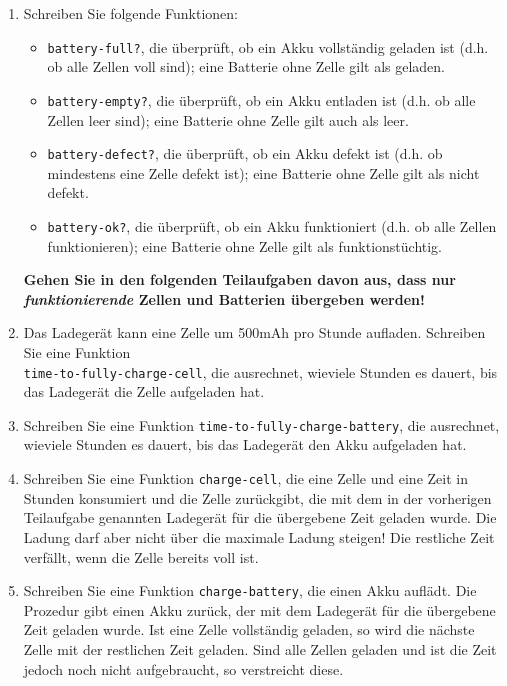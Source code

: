 \begin{aufgabe}
\begin{enumerate}
  \item Schreiben Sie folgende Funktionen:

    \begin{itemize}
    \item \texttt{battery-full?}, die überprüft, ob ein Akku
      vollständig geladen ist (d.h. ob alle Zellen voll sind); eine
      Batterie ohne Zelle gilt als geladen.

    \item \texttt{battery-empty?}, die überprüft, ob ein Akku entladen
      ist (d.h. ob alle Zellen leer sind); eine Batterie ohne Zelle
      gilt auch als leer.

    \item \texttt{battery-defect?}, die überprüft, ob ein Akku defekt
      ist (d.h. ob mindestens eine Zelle defekt ist); eine Batterie
      ohne Zelle gilt als nicht defekt.

    \item \texttt{battery-ok?}, die überprüft, ob ein Akku
      funktioniert (d.h. ob alle Zellen funktionieren); eine Batterie
      ohne Zelle gilt als funktionstüchtig.
      
    \end{itemize}

    \textbf{Gehen Sie in den folgenden Teilaufgaben davon aus, dass
      nur \emph{funktionierende} Zellen und Batterien übergeben
      werden!}

  \item Das Ladegerät kann eine Zelle um 500mAh pro Stunde
    aufladen.  Schreiben Sie eine Funktion \\
    \texttt{time-to-fully-charge-cell}, die ausrechnet, wieviele
    Stunden es dauert, bis das Ladegerät die Zelle aufgeladen hat.

  \item Schreiben Sie eine Funktion
    \texttt{time-to-fully-charge-battery}, die ausrechnet, wieviele
    Stunden es dauert, bis das Ladegerät den Akku aufgeladen hat.

  \item Schreiben Sie eine Funktion \texttt{charge-cell}, die eine
    Zelle und eine Zeit in Stunden konsumiert und die Zelle
    zurückgibt, die mit dem in der vorherigen Teilaufgabe genannten
    Ladegerät für die übergebene Zeit geladen wurde.  Die Ladung darf
    aber nicht über die maximale Ladung steigen!  Die restliche Zeit
    verfällt, wenn die Zelle bereits voll ist.

  \item Schreiben Sie eine Funktion \texttt{charge-battery}, die einen
    Akku auflädt.  Die Prozedur gibt einen Akku zurück, der mit dem
    Ladegerät für die übergebene Zeit geladen wurde.  Ist eine Zelle
    vollständig geladen, so wird die nächste Zelle mit der restlichen
    Zeit geladen.  Sind alle Zellen geladen und ist die Zeit jedoch
    noch nicht aufgebraucht, so verstreicht diese.


\end{enumerate}
\end{aufgabe}
